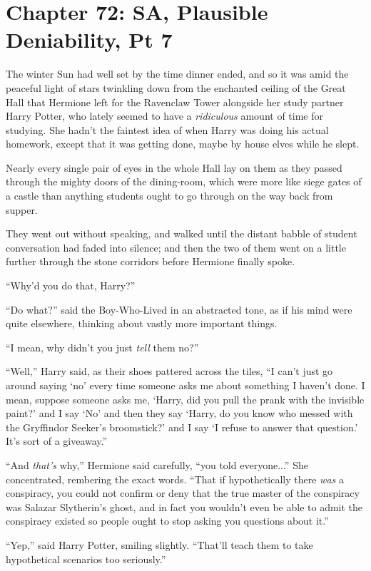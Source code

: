 \chapter{Chapter 72: SA, Plausible Deniability, Pt 7}
The winter Sun had well set by the time dinner ended, and so it was amid the peaceful light of stars twinkling down from the enchanted ceiling of the Great Hall that Hermione left for the Ravenclaw Tower alongside her study partner Harry Potter, who lately seemed to have a \emph{ridiculous} amount of time for studying. She hadn't the faintest idea of when Harry was doing his actual homework, except that it was getting done, maybe by house elves while he slept.

Nearly every single pair of eyes in the whole Hall lay on them as they passed through the mighty doors of the dining-room, which were more like siege gates of a castle than anything students ought to go through on the way back from supper.

They went out without speaking, and walked until the distant babble of student conversation had faded into silence; and then the two of them went on a little further through the stone corridors before Hermione finally spoke.

``Why'd you do that, Harry?''

``Do what?'' said the Boy-Who-Lived in an abstracted tone, as if his mind were quite elsewhere, thinking about vastly more important things.

``I mean, why didn't you just \emph{tell} them no?''

``Well,'' Harry said, as their shoes pattered across the tiles, ``I can't just go around saying `no' every time someone asks me about something I haven't done. I mean, suppose someone asks me, `Harry, did you pull the prank with the invisible paint?' and I say `No' and then they say `Harry, do you know who messed with the Gryffindor Seeker's broomstick?' and I say `I refuse to answer that question.' It's sort of a giveaway.''

``And \emph{that's} why,'' Hermione said carefully, ``you told everyone...'' She concentrated, rembering the exact words. ``That if hypothetically there \emph{was} a conspiracy, you could not confirm or deny that the true master of the conspiracy was Salazar Slytherin's ghost, and in fact you wouldn't even be able to admit the conspiracy existed so people ought to stop asking you questions about it.''

``Yep,'' said Harry Potter, smiling slightly. ``That'll teach them to take hypothetical scenarios too seriously.''

